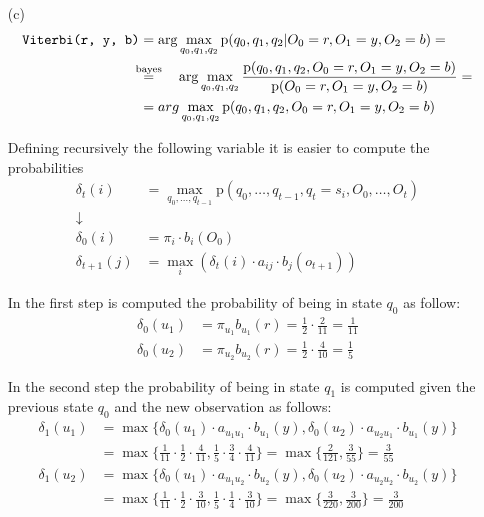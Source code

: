 {\begin{itemize}
		\item[(c)]
			\begin{align*}
			\text{\texttt{Viterbi(r, y, b)}} & = \arg \max_{q_0, q_1, q_2} 
			\mathrm{p}(q_0, q_1, q_2 | O_0= r, O_1=y,O_2=b) = \\
			&\overset{\mathclap{\text{bayes}}}{=} \hspace*{1.5em} \arg 
			\max_{q_0, q_1, q_2} \frac{\mathrm{p}(q_0, q_1, q_2, O_0= r, 
			O_1=y,O_2=b) 
			}{\mathrm{p}(O_0= r, O_1=y,O_2=b) } = \\
			& = arg \max_{q_0, q_1, q_2} \mathrm{p}(q_0, q_1, q_2, O_0= r, 
			O_1=y,O_2=b)
			\end{align*}
			
			Defining recursively the following variable it is easier to compute 
			the probabilities 
			\begin{align*}
				\delta_{t}(i) & = \max_{q_0, \dots, q_{t-1}} \mathrm{p} (q_0, 
				\dots, q_{t-1}, q_t=s_i, O_0, \dots, O_t)\\
				 \downarrow &\\
				\delta_0(i) & =\pi_i \cdot b_i (O_0) \\ 
				\delta_{t+1}(j) & = \max_i (\delta_t(i)\cdot a_{ij}\cdot 
				b_j(o_{t+1}))
			\end{align*}
			
			In the first step is computed the probability of being in state 
			$q_0$ as follow:
			\begin{align*}
			\delta_0(u_1) & =\pi_{u_1} b_{u_1}(r) = \frac{1}{2} \cdot 
			\frac{2}{11} = \frac{1}{11} \\
			\delta_0(u_2) & = \pi_{u_2} b_{u_2}(r) = \frac{1}{2} \cdot 
			\frac{4}{10} = \frac{1}{5}
			\end{align*}
			
			In the second step the probability of being in state $q_1$ is 
			computed given the previous state $q_0$ and the new observation as 
			follows:
			\begin{align*}
			\delta_1(u_1) & = \max \{ \delta_0(u_1) \cdot a_{u_1 u_1} \cdot 
			b_{u_1}(y), \delta_0(u_2) \cdot a_{u_2 u_1} \cdot b_{u_1}(y) \}
			\\
			& = \max \{ \frac{1}{11} \cdot \frac{1}{2} \cdot 
			\frac{4}{11}, \frac{1}{5} \cdot \frac{3}{4} \cdot \frac{4}{11} \} = 
			\max \{ \frac{2}{121} , \frac{3}{55} \} = \frac{3}{55}
			\\
			\delta_1(u_2) & = \max \{ \delta_0(u_1) \cdot a_{u_1 u_2} \cdot 
			b_{u_2}(y), \delta_0(u_2) \cdot a_{u_2 u_2} \cdot b_{u_2}(y) \}
			\\
			& = \max \{ \frac{1}{11} \cdot \frac{1}{2} \cdot 
			\frac{3}{10}, \frac{1}{5} \cdot \frac{1}{4} \cdot \frac{3}{10} \} = 
			\max \{ \frac{3}{220} , \frac{3}{200} \} = \frac{3}{200} 
			\end{align*}
			

\end{itemize}}
